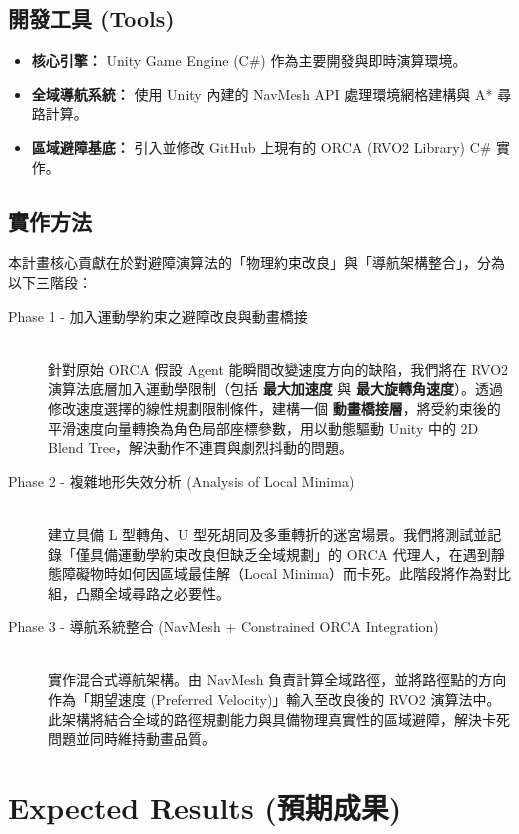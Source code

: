 \documentclass[11pt, a4paper]{article}
\begin{document}
\subsection{開發工具 (Tools)}
\begin{itemize}
    \item \textbf{核心引擎：} Unity Game Engine (C\#) 作為主要開發與即時演算環境。
    \item \textbf{全域導航系統：} 使用 Unity 內建的 NavMesh API 處理環境網格建構與 A* 尋路計算。
    \item \textbf{區域避障基底：} 引入並修改 GitHub 上現有的 ORCA (RVO2 Library) C\# 實作。
\end{itemize}

\subsection{實作方法}
本計畫核心貢獻在於對避障演算法的「物理約束改良」與「導航架構整合」，分為以下三階段：

\begin{description}
    \item[Phase 1 - 加入運動學約束之避障改良與動畫橋接] \hfill \\
    針對原始 ORCA 假設 Agent 能瞬間改變速度方向的缺陷，我們將在 RVO2 演算法底層加入運動學限制（包括 \textbf{最大加速度} 與 \textbf{最大旋轉角速度}）。透過修改速度選擇的線性規劃限制條件，建構一個 \textbf{動畫橋接層}，將受約束後的平滑速度向量轉換為角色局部座標參數，用以動態驅動 Unity 中的 2D Blend Tree，解決動作不連貫與劇烈抖動的問題。

    \item[Phase 2 - 複雜地形失效分析 (Analysis of Local Minima)] \hfill \\
    建立具備 L 型轉角、U 型死胡同及多重轉折的迷宮場景。我們將測試並記錄「僅具備運動學約束改良但缺乏全域規劃」的 ORCA 代理人，在遇到靜態障礙物時如何因區域最佳解（Local Minima）而卡死。此階段將作為對比組，凸顯全域尋路之必要性。

    \item[Phase 3 - 導航系統整合 (NavMesh + Constrained ORCA Integration)] \hfill \\
    實作混合式導航架構。由 NavMesh 負責計算全域路徑，並將路徑點的方向作為「期望速度 (Preferred Velocity)」輸入至改良後的 RVO2 演算法中。此架構將結合全域的路徑規劃能力與具備物理真實性的區域避障，解決卡死問題並同時維持動畫品質。
\end{description}

\section{Expected Results (預期成果)}
\end{document}
